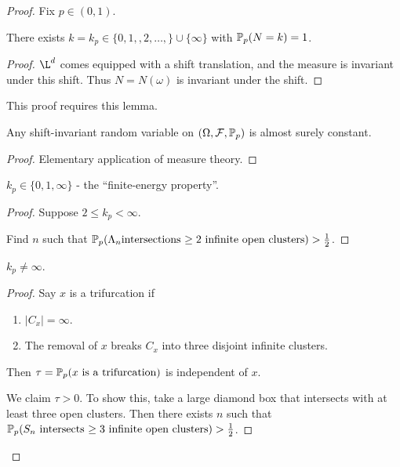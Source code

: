 \begin{proof}
  Fix $p \in (0, 1)$.

  \begin{lem}[Part A]
    There exists $k = k_{p} \in \{ 0, 1, ,2, \dots, \} \cup \{ \infty
    \}$ with $\Prob_{p}(N = k) = 1$.
  \end{lem}

  \begin{proof}
    $\L^{d}$ comes equipped with a shift translation, and the measure
    is invariant under this shift.  Thus $N = N(\omega)$ is invariant
    under the shift.
  \end{proof}

  This proof requires this lemma.
  \begin{lem}
    Any shift-invariant random variable on $(\Omega, \mathcal{F},
    \Prob_{p})$ is almost surely constant.
  \end{lem}

  \begin{proof}
    Elementary application of measure theory. 
  \end{proof}

  \begin{lem}[Part B]
    $k_{p} \in \{ 0, 1, \infty \}$ - the ``finite-energy property''.
  \end{lem}

  \begin{proof}
    Suppose $2 \leq k_{p} < \infty$.

    Find $n$ such that $\Prob_{p}(\Lambda_{n} \text{intersections
      $\geq 2$ infinite open clusters}) > \frac{1}{2}$.
  \end{proof}

  \begin{lem}[Part C]
    $k_{p} \neq \infty$.
  \end{lem}

  \begin{proof}
    Say $x$ is a trifurcation if
    \begin{enumerate}
    \item $|C_x| = \infty$.
    \item The removal of $x$ breaks $C_{x}$ into three disjoint
      infinite clusters.
    \end{enumerate}

    Then $\tau = \Prob_{p}(\text{$x$ is a trifurcation})$ is
    independent of $x$.

    We claim $\tau > 0$.  To show this, take a large diamond box that
    intersects with at least three open clusters.  Then there exists
    $n$ such that $\Prob_{p}(\text{$S_{n}$ intersects $\geq 3$
      infinite open clusters}) > \frac{1}{2}$.


\end{proof}
\end{proof}
